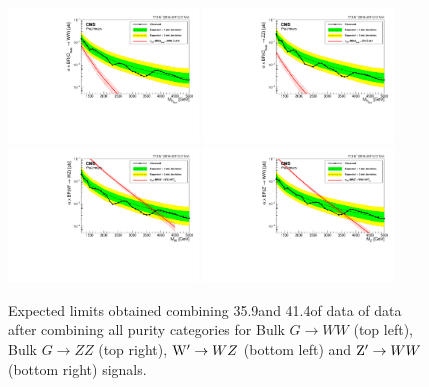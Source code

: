 \begin{figure}[h!]
\centering
\includegraphics[width=0.45\textwidth]{figures/analysis/search3/AN-17-303/limits/limits_BulkGWW_combo_2016_2017.pdf}
\includegraphics[width=0.45\textwidth]{figures/analysis/search3/AN-17-303/limits/limits_BulkGZZ_combo_2016_2017.pdf}\\
\includegraphics[width=0.45\textwidth]{figures/analysis/search3/AN-17-303/limits/limits_WprimeWZ_combo_2016_2017.pdf}
\includegraphics[width=0.45\textwidth]{figures/analysis/search3/AN-17-303/limits/limits_ZprimeWW_combo_2016_2017.pdf}
\caption{Expected limits obtained combining 35.9\fbinv and 41.4\fbinv of data of data after combining all purity categories for Bulk $G\rightarrow WW$ (top left), Bulk $G\rightarrow ZZ$ 
(top right), $\mathrm{W}^\prime\rightarrow WZ$ (bottom left) and $\mathrm{Z}^\prime\rightarrow WW$ (bottom right) signals.}
\label{fig:searchIII:limitsCombo}
\end{figure}
